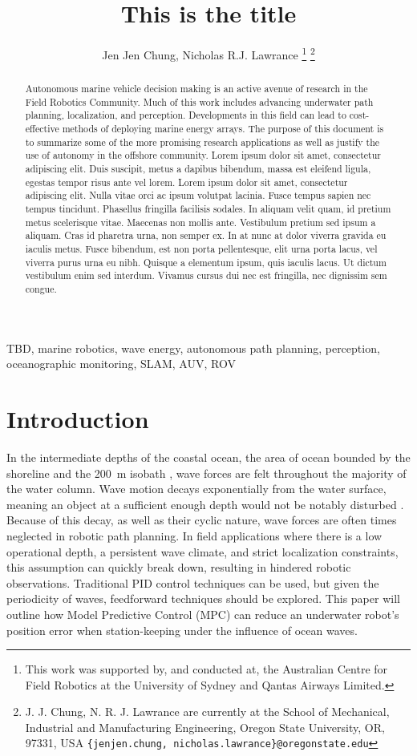 \documentclass[letterpaper, 10 pt, conferences]{ieeeconf}  %
\title{\LARGE \bf
This is the title
}
\author{Jen Jen Chung, Nicholas R.J. Lawrance
\thanks{This work was supported by, and conducted at, the Australian Centre for Field Robotics at the University of Sydney and Qantas Airways Limited.}
\thanks{J. J. Chung, N. R. J. Lawrance are currently at the School of Mechanical, Industrial and Manufacturing Engineering, Oregon State University, OR, 97331, USA {\tt\small\{jenjen.chung, nicholas.lawrance\}@oregonstate.edu}}
}
\begin{document}
\maketitle
\thispagestyle{empty}
\pagestyle{empty}

\begin{abstract}
Autonomous marine vehicle decision making is an active avenue of research in the Field Robotics Community. Much of this work includes advancing underwater path planning, localization, and perception. Developments in this field can lead to cost-effective methods of deploying marine energy arrays. The purpose of this document is to summarize some of the more promising research applications as well as justify the use of autonomy in the offshore community. Lorem ipsum dolor sit amet, consectetur adipiscing elit. Duis suscipit, metus a dapibus bibendum, massa est eleifend ligula, egestas tempor risus ante vel lorem. Lorem ipsum dolor sit amet, consectetur adipiscing elit. Nulla vitae orci ac ipsum volutpat lacinia. Fusce tempus sapien nec tempus tincidunt. Phasellus fringilla facilisis sodales. In aliquam velit quam, id pretium metus scelerisque vitae. Maecenas non mollis ante. Vestibulum pretium sed ipsum a aliquam. Cras id pharetra urna, non semper ex. In at nunc at dolor viverra gravida eu iaculis metus. Fusce bibendum, est non porta pellentesque, elit urna porta lacus, vel viverra purus urna eu nibh. Quisque a elementum ipsum, quis iaculis lacus. Ut dictum vestibulum enim sed interdum. Vivamus cursus dui nec est fringilla, nec dignissim sem congue.
\end{abstract}

\begin{IEEEkeywords}	
TBD, marine robotics, wave energy, autonomous path planning, perception, oceanographic monitoring, SLAM, AUV, ROV
\end{IEEEkeywords}

\section{Introduction} 
\label{sec:introduction}

In the intermediate depths of the coastal ocean, the area of ocean bounded by the shoreline and the 200~m isobath \cite{phillips}, wave forces are felt throughout the majority of the water column. Wave motion decays exponentially from the water surface, meaning an object at a sufficient enough depth would not be notably disturbed \cite{D&D}. Because of this decay, as well as their cyclic nature, wave forces are often times neglected in robotic path planning. In field applications where there is a low operational depth, a persistent wave climate, and strict localization constraints, this assumption can quickly break down, resulting in hindered robotic observations. Traditional PID control techniques can be used, but given the periodicity of waves, feedforward techniques should be explored. This paper will outline how Model Predictive Control (MPC) can reduce an underwater robot's position error when station-keeping under the influence of ocean waves.
\end{document}

